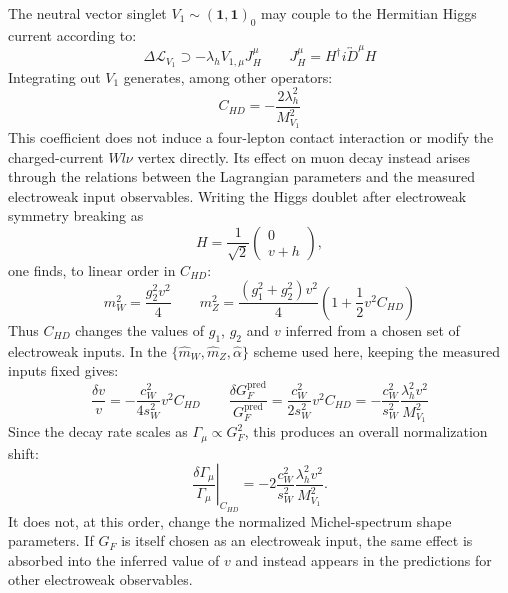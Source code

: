 The neutral vector singlet $V_1\sim(\mathbf 1,\mathbf 1)_0$ may couple to
the Hermitian Higgs current according to:
\begin{equation}
    \Delta\mathcal L_{V_1}
    \supset
    -\lambda_h V_{1,\mu}J_H^\mu
    \qquad
    J_H^\mu=H^\dagger i\overleftrightarrow D^\mu H
\end{equation}
Integrating out $V_1$ generates, among other operators:
\begin{equation}
    C_{HD}=-\frac{2\lambda_h^2}{M_{V_1}^2}
    \label{eq:v1-chd-matching-short}
\end{equation}
This coefficient does not induce a four-lepton contact interaction or
modify the charged-current $Wl\nu$ vertex directly.  Its effect on
muon decay instead arises through the relations between the Lagrangian
parameters and the measured electroweak input observables.  Writing the
Higgs doublet after electroweak symmetry breaking as
\begin{equation}
    H=\frac{1}{\sqrt2}
      \begin{pmatrix}0\\v+h\end{pmatrix},
\end{equation}
one finds, to linear order in $C_{HD}$:
\begin{equation}
    m_W^2=\frac{g_2^2v^2}{4}
    \qquad
    m_Z^2=\frac{(g_1^2+g_2^2)v^2}{4}
    \left(1+\frac12v^2C_{HD}\right)
    \label{eq:chd-input-masses-short}
\end{equation}
Thus $C_{HD}$ changes the values of $g_1$, $g_2$ and $v$ inferred from a
chosen set of electroweak inputs.  In the
$\{\widehat m_W,\widehat m_Z,\widehat\alpha\}$ scheme used here, keeping
the measured inputs fixed gives:
\begin{equation}
    \frac{\delta v}{v}
    =-\frac{c_W^2}{4s_W^2}v^2C_{HD}
    \qquad
    \frac{\delta G_F^{\mathrm{pred}}}{G_F^{\mathrm{pred}}}
    =\frac{c_W^2}{2s_W^2}v^2C_{HD}
    =-\frac{c_W^2}{s_W^2}
      \frac{\lambda_h^2v^2}{M_{V_1}^2}
    \label{eq:chd-input-gf-short}
\end{equation}
Since the decay rate scales as $\Gamma_\mu\propto G_F^2$, this produces
an overall normalization shift:
\begin{equation}
    \left.\frac{\delta\Gamma_\mu}{\Gamma_\mu}\right|_{C_{HD}}
    =-2\frac{c_W^2}{s_W^2}
      \frac{\lambda_h^2v^2}{M_{V_1}^2}.
\end{equation}
It does not, at this order, change the normalized Michel-spectrum shape
parameters.  If $G_F$ is itself chosen as an electroweak input, the same
effect is absorbed into the inferred value of $v$ and instead appears in
the predictions for other electroweak observables.

